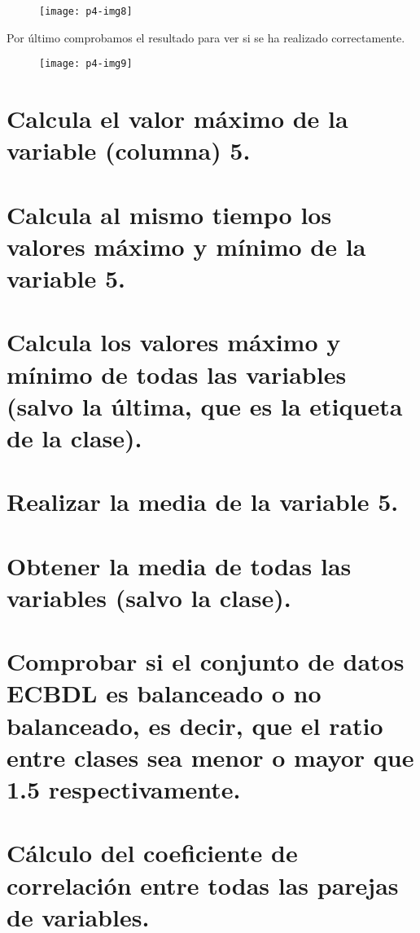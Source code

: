 \documentclass[10pt]{article}
\begin{document}
\begin{figure}[H]
	\begin{center}
 		\texttt{[image: p4-img8]}
	\end{center} 
\end{figure}

Por último comprobamos el resultado para ver si se ha realizado correctamente. \\

\begin{figure}[H]
	\begin{center}
 		\texttt{[image: p4-img9]}
	\end{center} 
\end{figure}

\section{Calcula el valor máximo de la variable (columna) 5.} 

\section{Calcula al mismo tiempo los valores máximo y mínimo de la variable 5.} 

\section{Calcula los valores máximo y mínimo de todas las variables (salvo la última, que es la  etiqueta de la clase).} 

\section{Realizar la media de la variable 5.} 

\section{Obtener la media de todas las variables (salvo la clase).} 

\section{Comprobar si el conjunto de datos ECBDL es balanceado o no balanceado, es decir, que el ratio entre clases sea menor o mayor que 1.5 respectivamente.} 

\section{Cálculo del coeficiente de correlación entre todas las parejas de variables.} 
\end{document}
